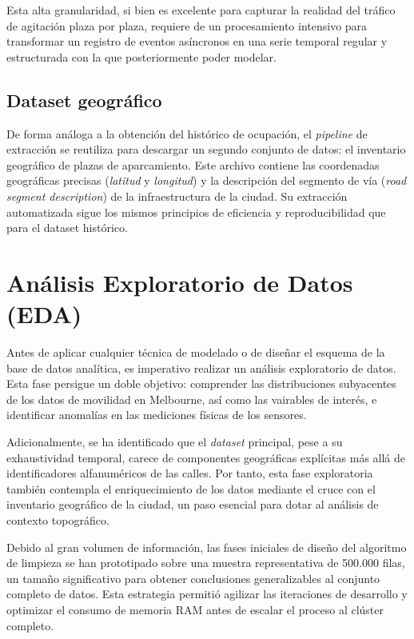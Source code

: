 Esta alta granularidad, si bien es excelente para capturar la realidad del tráfico de agitación plaza por plaza, requiere de un procesamiento intensivo para transformar un registro de eventos asíncronos en una serie temporal regular y estructurada con la que posteriormente poder modelar.

\subsection{Dataset geográfico}
\label{subsec:dataset_geo}
De forma análoga a la obtención del histórico de ocupación, el \textit{pipeline} de extracción se reutiliza para descargar un segundo conjunto de datos: el inventario geográfico de plazas de aparcamiento. Este archivo contiene las coordenadas geográficas precisas (\textit{latitud} y \textit{longitud}) y la descripción del segmento de vía (\textit{road segment description}) de la infraestructura de la ciudad. Su extracción automatizada sigue los mismos principios de eficiencia y reproducibilidad que para el dataset histórico.


\section{Análisis Exploratorio de Datos (EDA)}
\label{sec:eda}

Antes de aplicar cualquier técnica de modelado o de diseñar el esquema de la base de datos analítica, es imperativo realizar un análisis exploratorio de datos. Esta fase persigue un doble objetivo: comprender las distribuciones subyacentes de los datos de movilidad en Melbourne, así como las vairables de interés, e identificar anomalías  en las mediciones físicas de los sensores.

Adicionalmente, se ha identificado que el \textit{dataset} principal, pese a su exhaustividad temporal, carece de componentes geográficas explícitas más allá de identificadores alfanuméricos de las calles. Por tanto, esta fase exploratoria también contempla el enriquecimiento de los datos mediante el cruce con el inventario geográfico de la ciudad, un paso esencial para dotar al análisis de contexto topográfico.

Debido al gran volumen de información, las fases iniciales de diseño del algoritmo de limpieza se han prototipado sobre una muestra representativa de 500.000 filas, un tamaño significativo para obtener conclusiones generalizables al conjunto completo de datos. Esta estrategia permitió agilizar las iteraciones de desarrollo y optimizar el consumo de memoria RAM antes de escalar el proceso al clúster completo.

